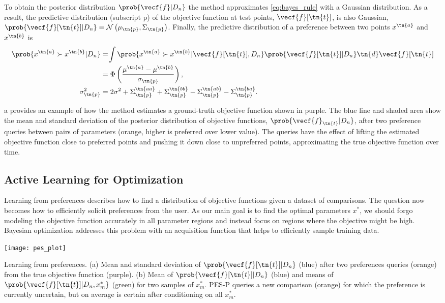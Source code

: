 To obtain the posterior distribution $\prob{\vecf{f}|D_n}$ the method
approximates \cref{eq:bayes_rule} with a Gaussian distribution. As a result, the
predictive distribution (subscript p) of the objective function at test points,
$\vecf{f}[\tn{t}]$, is also Gaussian, $\prob{\vecf{f}[\tn{t}] | D_n} =
\mathcal{N} \left( \mu_\tn{p}, \Sigma_\tn{p} \right)$. Finally, the predictive
distribution of a preference between two points $x^\tn{a}$ and $x^\tn{b}$ is 
\begin{align} 
    \prob{x^\tn{a} \succ x^\tn{b} |D_n} 
    &=\hspace{-2pt}\int \prob{x^\tn{a} \succ x^\tn{b}|\vecf{f}[\tn{t}],D_n}
    \prob{\vecf{f}[\tn{t}]| D_n} \tn{d} \vecf{f}[\tn{t}] 
        \label{eq:prob_of_pref}\\
    &= \Phi \left(\frac{\mu^\tn{a} - \mu^\tn{b}}{\sigma_\tn{p}} \right),
        \label{eq:p_pref} \\ 
    \sigma_\tn{p}^2 &= 2\sigma^2 + \Sigma_\tn{p}^\tn{aa} + \Sigma_\tn{p}^\tn{bb}
        - \Sigma_\tn{p}^\tn{ab} - \Sigma_\tn{p}^\tn{ba}.
\end{align}

a provides an example of how the method estimates a
ground-truth objective function shown in purple. The blue line and shaded area
show the mean and standard deviation of the posterior distribution of objective
functions, $\prob{\vecf{f}_\tn{t}|D_n}$, after two preference queries between
pairs of parameters (orange, higher is preferred over lower value). The queries
have the effect of lifting the estimated objective function close to preferred
points and pushing it down close to unpreferred points, approximating the true
objective function over time.

\subsection{Active Learning for Optimization}
Learning from preferences describes how to find a distribution of objective
functions given a dataset of comparisons. The question now becomes how to
efficiently solicit preferences from the user. As our main goal is to find the
optimal parameters $x^*$, we should forgo modeling the objective function
accurately in all parameter regions and instead focus on regions where the
objective might be high. Bayesian optimization addresses this problem with an
acquisition function that helps to efficiently sample training data.
\begin{marginfigure}
    \centering
    \texttt{[image: pes\_plot]}
    \caption{Learning from preferences. (a) Mean and standard deviation of
    $\prob{\vecf{f}[\tn{t}]|D_n}$ (blue) after two preferences queries (orange)
    from the true objective function (purple). (b) Mean of
    $\prob{\vecf{f}[\tn{t}]|D_n}$ (blue) and means of
    $\prob{\vecf{f}[\tn{t}]|D_n, x_m^*}$ (green) for two samples of $x_m^*$.
    PES-P queries a new comparison (orange) for which the preference is
    currently uncertain, but on average is certain after conditioning on all
    $x_m^*$.}\label{fig:pes_plot}
\end{marginfigure}


